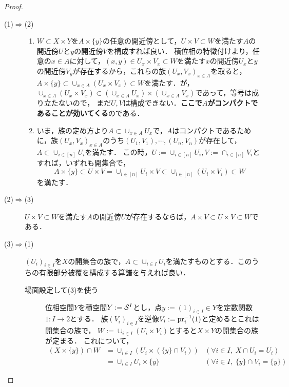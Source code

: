 \documentclass[uplatex,dvipdfmx]{jsreport}
\begin{document}
\begin{proof}\mbox{}
    \begin{description}
        \item[(1)$\Rightarrow$(2)] 
        \begin{enumerate}
        \item 
        $W\subset X\times Y$を$A\times\{y\}$の任意の開近傍として，$U\times V\subset W$を満たす$A$の開近傍$U$と$y$の開近傍$V$を構成すれば良い．
        積位相の特徴付けより，任意の$x\in A$に対して，$(x,y)\in U_x\times V_x\subset W$を満たす$x$の開近傍$U_x$と$y$の開近傍$V_y$が存在するから，これらの族$(U_x,V_x)_{x\in A}$を取ると，
        $A\times\{y\}\subset\cup_{x\in A}(U_x\times V_x)\subset W$を満たす．が，$\cup_{x\in A}(U_x\times V_x)\subset (\cup_{x\in A}U_x)\times(\cup_{x\in A}V_x)$であって，等号は成り立たないので，
        まだ$U,V$は構成できない．\textbf{ここで$A$がコンパクトであることが効いてくる}のである．
        \item
        いま，族の定め方より$A\subset\cup_{x\in A}U_x$で，$A$はコンパクトであるために，族$(U_x,V_x)_{x\in A}$のうち$(U_1,V_1),\cdots,(U_n,V_n)$が存在して，$A\subset\cup_{i\in[n]}U_i$を満たす．
        この時，$U:=\cup_{i\in[n]}U_i,V:=\cap_{i\in[n]}V_i$とすれば，いずれも開集合で，
        \[A\times\{y\}\subset U\times V=\cup_{i\in[n]}U_i\times V\subset\cup_{i\in[n]}(U_i\times V_i)\subset W\]
        を満たす．
        \end{enumerate}
        \item[(2)$\Rightarrow$(3)]
        $U\times V\subset W$を満たす$A$の開近傍$U$が存在するならば，$A\times V\subset U\times V\subset W$である．
        \item[(3)$\Rightarrow$(1)] $(U_i)_{i\in I}$を$X$の開集合の族で，$A\subset\cup_{i\in I}U_i$を満たすものとする．このうちの有限部分被覆を構成する算譜を与えれば良い．
        \begin{description}
            \item[場面設定して(3)を使う] 
            位相空間$Y$を積空間$Y:=\S^I$とし，点$y:=(1)_{i\in I}\in Y$を定数関数$1:I\to 2$とする．
            族$(V_i)_{i\in I}$を逆像$V_i:=\pr_i^{-1}(1)$と定めるとこれは開集合の族で，
            $W:=\cup_{i\in I}(U_i\times V_i)$とすると$X\times Y$の開集合の族が定まる．
            これについて，
            \begin{align*}
                (X\times\{y\})\cap W&=\cup_{i\in I}(U_i\times(\{y\}\cap V_i))&(\forall i\in I,\;X\cap U_i=U_i)\\
                &=\cup_{i\in I}U_i\times\{y\}&(\forall i\in I,\;\{y\}\cap V_i=\{y\})

\end{align*}
\end{description}
\end{description}
\end{proof}
\end{document}
